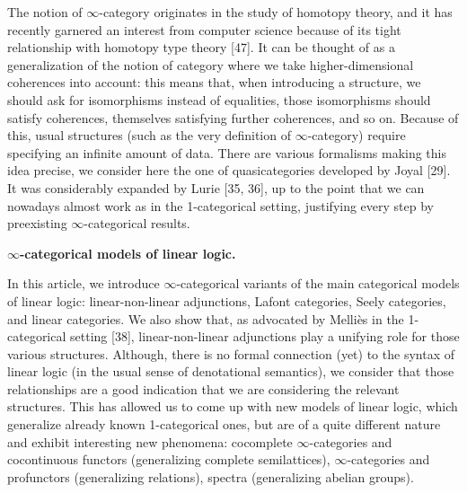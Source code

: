 The notion of $\infty$-category originates in the study of homotopy theory, and it has recently garnered an interest from computer science because of its tight relationship with homotopy type theory [47]. It can be thought of as a generalization of the notion of category where we take higher-dimensional coherences into account: this means that, when introducing a structure, we should ask for isomorphisms instead of equalities, those isomorphisms should satisfy coherences, themselves satisfying further coherences, and so on. Because of this, usual structures (such as the very definition of $\infty$-category) require specifying an infinite amount of data. There are various formalisms making this idea precise, we consider here the one of quasicategories developed by Joyal [29]. It was considerably expanded by Lurie [35, 36], up to the point that we can nowadays almost work as in the 1-categorical setting, justifying every step by preexisting $\infty$-categorical results.\par
 
 
 
 
\par\medskip\noindent\textbf{$\infty$-categorical models of linear logic.}\par
 
 
In this article, we introduce $\infty$-categorical variants of the main categorical models of linear logic: linear-non-linear adjunctions, Lafont categories, Seely categories, and linear categories. We also show that, as advocated by Melliès in the 1-categorical setting [38], linear-non-linear adjunctions play a unifying role for those various structures. Although, there is no formal connection (yet) to the syntax of linear logic (in the usual sense of denotational semantics), we consider that those relationships are a good indication that we are considering the relevant structures. This has allowed us to come up with new models of linear logic, which generalize already known 1-categorical ones, but are of a quite different nature and exhibit interesting new phenomena: cocomplete $\infty$-categories and cocontinuous functors (generalizing complete semilattices), $\infty$-categories and profunctors (generalizing relations), spectra (generalizing abelian groups).\par
 

